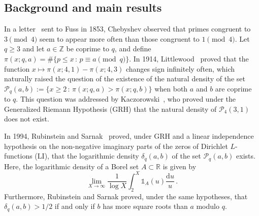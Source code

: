 \documentclass[12pt]{amsart}
\numberwithin{equation}{section}
\newcommand{\R}{\mathbb R}
\newcommand{\Z}{\mathbb Z}
\theoremstyle{definition}
\theoremstyle{remark}
\begin{document}
\subsection{Background and main results}
In a letter~\cite{Chebyshev} sent to Fuss in 1853, Chebyshev observed that primes congruent to $3\pmod{4}$ seem to appear more often than those congruent to $1\pmod{4}$. Let $q\ge3$ and let $a\in \Z$ be coprime to $q$, and define $\pi(x;q,a)=\#\{ p\le x\, \colon\,   p\equiv a\pmod{q}\}$. 
In 1914, Littlewood~\cite{Littlewood} proved that the function $x\mapsto\pi(x;4,1)-\pi(x;4,3)$ changes sign infinitely often, which naturally raised the question of the existence of the natural density of the set $\mathcal{P}_q(a,b):=\{x\ge 2\, \colon\,  \pi(x;q,a)>\pi(x;q,b)\}$ when both $a$ and $b$ are coprime to $q$. This question was addressed by Kaczorowski~\cite{Kac95}, who proved under the Generalized Riemann Hypothesis ($\mathrm{GRH}$) that the natural density of $\mathcal{P}_4(3,1)$ does not exist. 

In 1994, Rubinstein and Sarnak~\cite{RS94} proved, under $\mathrm{GRH}$ and a linear independence hypothesis on the non-negative imaginary parts of the zeros of Dirichlet $L$-functions ($\mathrm{LI}$), that the logarithmic density $\delta_q(a,b)$ of the set $\mathcal{P}_q(a,b)$ exists. Here, the logarithmic density of a Borel set $A\subset\R$ is given by 
\[ \lim_{X\to \infty} \frac{1}{\log X}\int_{2}^X \mathds{1}_{A}(u)\frac{\mathrm{d}u}{u}\, .\]
Furthermore, Rubinstein and Sarnak proved, under the same hypotheses, that $\delta_q(a,b)>1/2$ if and only if $b$ has more square roots than $a$ modulo $q$.
\end{document}
